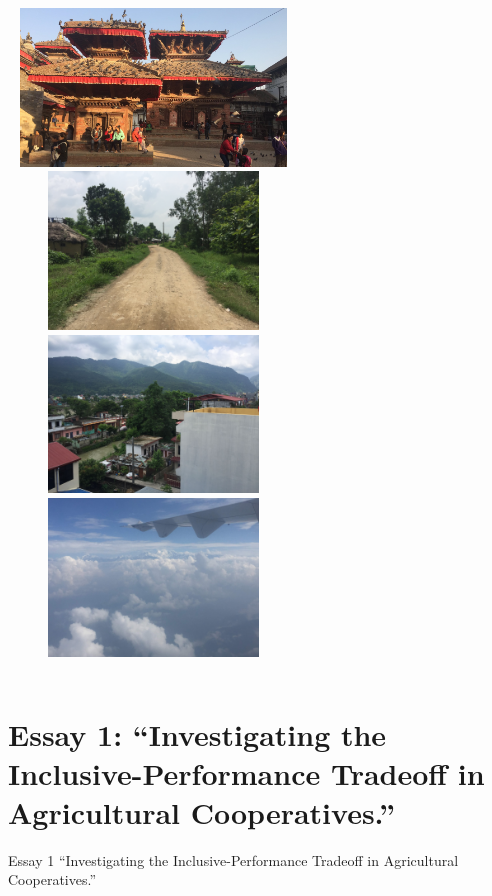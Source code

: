 \documentclass[aspectratio=169]{beamer}
\begin{document}
\begin{frame}
\begin{columns}[t]
\centering
\includegraphics[width=7.7cm,height=4.2cm]{travel1.jpg}\\
\includegraphics[width=7.7cm,height=4.2cm]{travel3.jpg}
\centering
\includegraphics[width=7.7cm,height=4.2cm]{travel2.jpg}\\
\includegraphics[width=7.7cm,height=4.2cm]{travel4.jpg}
\end{columns}
\end{frame}


\section{Essay 1: ``Investigating the Inclusive-Performance Tradeoff in Agricultural Cooperatives.''}
\begin{frame}{Essay 1}
\centering
\Large{``Investigating the Inclusive-Performance Tradeoff in Agricultural Cooperatives.''}
\end{frame}
\end{document}
